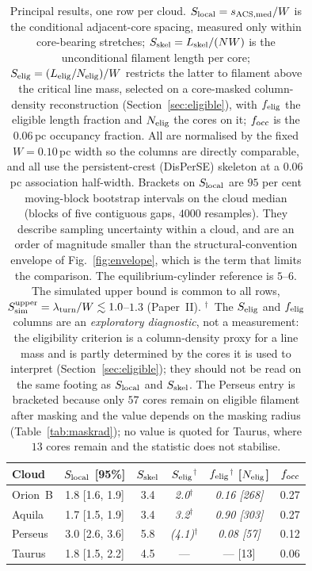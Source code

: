 \documentclass[usenatbib,twoside,twocolumn]{mnras}
\begin{document}
\begin{table}
\caption{Principal results, one row per cloud. $S_{\rm local}=s_{\rm ACS,med}/W$ is the conditional adjacent-core spacing, measured only within core-bearing stretches; $S_{\rm skel}=L_{\rm skel}/(NW)$ is the unconditional filament length per core; $S_{\rm elig}=(L_{\rm elig}/N_{\rm elig})/W$ restricts the latter to filament above the critical line mass, selected on a core-masked column-density reconstruction (Section~\ref{sec:eligible}), with $f_{\rm elig}$ the eligible length fraction and $N_{\rm elig}$ the cores on it; $f_{\rm occ}$ is the $0.06$\,pc occupancy fraction. All are normalised by the fixed $W=0.10$\,pc width so the columns are directly comparable, and all use the persistent-crest (DisPerSE) skeleton at a $0.06$\,pc association half-width. Brackets on $S_{\rm local}$ are $95$ per cent moving-block bootstrap intervals on the cloud median (blocks of five contiguous gaps, $4000$ resamples). They describe sampling uncertainty within a cloud, and are an order of magnitude smaller than the structural-convention envelope of Fig.~\ref{fig:envelope}, which is the term that limits the comparison. The equilibrium-cylinder reference is $5$--$6$. The simulated upper bound is common to all rows, $S_{\rm sim}^{\rm upper}=\lambda_{\rm turn}/W\lesssim1.0$--$1.3$ (Paper~II). $^{\dagger}$~The $S_{\rm elig}$ and $f_{\rm elig}$ columns are an \emph{exploratory diagnostic}, not a measurement: the eligibility criterion is a column-density proxy for a line mass and is partly determined by the cores it is used to interpret (Section~\ref{sec:eligible}); they should not be read on the same footing as $S_{\rm local}$ and $S_{\rm skel}$. The Perseus entry is bracketed because only $57$ cores remain on eligible filament after masking and the value depends on the masking radius (Table~\ref{tab:maskrad}); no value is quoted for Taurus, where $13$ cores remain and the statistic does not stabilise.}
\label{tab:principal}
\footnotesize
\setlength{\tabcolsep}{4pt}
\begin{tabular}{lccccc}
\toprule
Cloud & $S_{\rm local}$ [95\%] & $S_{\rm skel}$ & \emph{$S_{\rm elig}$}$^{\dagger}$ & \emph{$f_{\rm elig}$}$^{\dagger}$ [$N_{\rm elig}$] & $f_{\rm occ}$ \\
\midrule
Orion~B & 1.8 [1.6, 1.9] & 3.4 & \emph{2.0}$^{\dagger}$ & \emph{0.16 [268]} & 0.27 \\
Aquila  & 1.7 [1.5, 1.9] & 3.4 & \emph{3.2}$^{\dagger}$ & \emph{0.90 [303]} & 0.27 \\
Perseus & 3.0 [2.6, 3.6] & 5.8 & \emph{(4.1)}$^{\dagger}$ & \emph{0.08 [57]} & 0.12 \\
Taurus  & 1.8 [1.5, 2.2] & 4.5 & ---    & --- [13]   & 0.06 \\
\bottomrule
\end{tabular}
\end{table}
\end{document}
